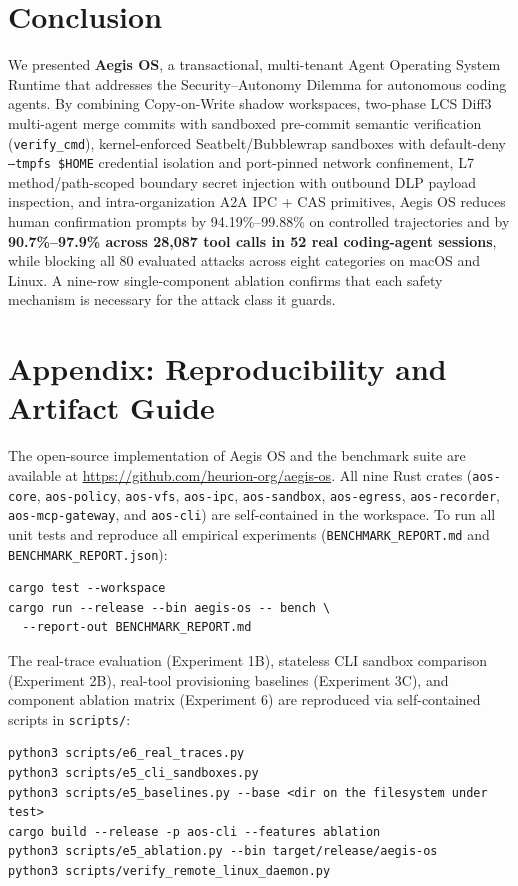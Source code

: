 \documentclass[10pt,twocolumn]{article}
\begin{document}
\section{Conclusion}
\label{sec:conclusion}

We presented \textbf{Aegis OS}, a transactional, multi-tenant Agent Operating System Runtime that addresses the Security--Autonomy Dilemma for autonomous coding agents. By combining Copy-on-Write shadow workspaces, two-phase LCS Diff3 multi-agent merge commits with sandboxed pre-commit semantic verification (\texttt{verify\_cmd}), kernel-enforced Seatbelt/Bubblewrap sandboxes with default-deny \texttt{--tmpfs \$HOME} credential isolation and port-pinned network confinement, L7 method/path-scoped boundary secret injection with outbound DLP payload inspection, and intra-organization A2A IPC + CAS primitives, Aegis OS reduces human confirmation prompts by 94.19\%--99.88\% on controlled trajectories and by \textbf{90.7\%--97.9\% across 28,087 tool calls in 52 real coding-agent sessions}, while blocking all 80 evaluated attacks across eight categories on macOS and Linux. A nine-row single-component ablation confirms that each safety mechanism is necessary for the attack class it guards.




\appendix

\section{Appendix: Reproducibility and Artifact Guide}
\label{sec:appendix}

The open-source implementation of Aegis OS and the benchmark suite are available at \url{https://github.com/heurion-org/aegis-os}. All nine Rust crates (\texttt{aos-core}, \texttt{aos-policy}, \texttt{aos-vfs}, \texttt{aos-ipc}, \texttt{aos-sandbox}, \texttt{aos-egress}, \texttt{aos-recorder}, \texttt{aos-mcp-gateway}, and \texttt{aos-cli}) are self-contained in the workspace. To run all unit tests and reproduce all empirical experiments (\texttt{BENCHMARK\_REPORT.md} and \texttt{BENCHMARK\_REPORT.json}):
\begin{lstlisting}
cargo test --workspace
cargo run --release --bin aegis-os -- bench \
  --report-out BENCHMARK_REPORT.md
\end{lstlisting}
The real-trace evaluation (Experiment 1B), stateless CLI sandbox comparison (Experiment 2B), real-tool provisioning baselines (Experiment 3C), and component ablation matrix (Experiment 6) are reproduced via self-contained scripts in \texttt{scripts/}:
\begin{lstlisting}
python3 scripts/e6_real_traces.py
python3 scripts/e5_cli_sandboxes.py
python3 scripts/e5_baselines.py --base <dir on the filesystem under test>
cargo build --release -p aos-cli --features ablation
python3 scripts/e5_ablation.py --bin target/release/aegis-os
python3 scripts/verify_remote_linux_daemon.py
\end{lstlisting}
\end{document}
